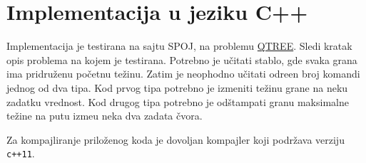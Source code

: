 \appendix
\section{Implementacija u jeziku C++}
\label{sirkod}
Implementacija je testirana na sajtu SPOJ, na problemu \href{https://www.spoj.com/problems/QTREE}{QTREE}. Sledi kratak opis problema na kojem je testirana. Potrebno je u\v citati stablo, gde svaka grana ima pridru\v zenu po\v cetnu te\v zinu. Zatim je neophodno u\v citati odre\dj en broj komandi jednog od dva tipa. Kod prvog tipa potrebno je izmeniti te\v zinu grane na neku zadatku vrednost. Kod drugog tipa potrebno je od\v stampati granu maksimalne te\v zine na putu izme\dj u neka dva zadata \v cvora. 

Za kompajliranje prilo\v zenog koda je dovoljan kompajler koji podr\v zava verziju \texttt{c++11}.

